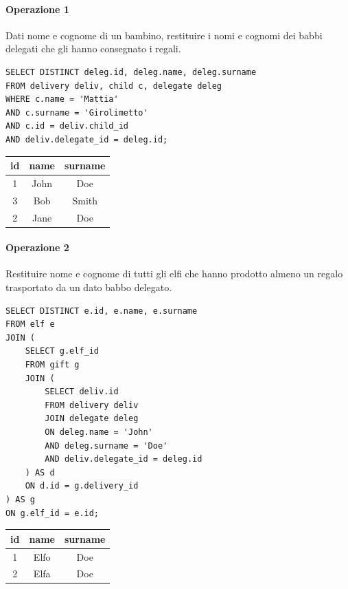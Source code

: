 \documentclass[12pt]{report}
\begin{document}
\paragraph{Operazione 1} Dati nome e cognome di un bambino, restituire i nomi e cognomi dei babbi delegati 
    che gli hanno consegnato i regali.
\begin{lstlisting}
SELECT DISTINCT deleg.id, deleg.name, deleg.surname 
FROM delivery deliv, child c, delegate deleg
WHERE c.name = 'Mattia' 
AND c.surname = 'Girolimetto'
AND c.id = deliv.child_id
AND deliv.delegate_id = deleg.id; 
\end{lstlisting}
\begin{center}
\begin{tabular}{|c|c|c|}
  \hline
  id & name & surname \\ \hline
  1 & John & Doe \\ \hline
  3 & Bob & Smith \\ \hline
  2 & Jane & Doe \\ \hline
\end{tabular}
    
\end{center}

\paragraph{Operazione 2}Restituire nome e cognome di tutti gli elfi che hanno prodotto almeno un regalo
    trasportato da un dato babbo delegato.
\begin{lstlisting}
SELECT DISTINCT e.id, e.name, e.surname 
FROM elf e 
JOIN (
	SELECT g.elf_id 
	FROM gift g
	JOIN (
		SELECT deliv.id
		FROM delivery deliv
		JOIN delegate deleg
		ON deleg.name = 'John'
		AND deleg.surname = 'Doe'
		AND deliv.delegate_id = deleg.id
	) AS d
	ON d.id = g.delivery_id
) AS g
ON g.elf_id = e.id;
\end{lstlisting}

\begin{center}
    \begin{tabular}{|c|c|c|}
  \hline
  id & name & surname \\ \hline
  1 & Elfo & Doe \\ \hline
  2 & Elfa & Doe \\ \hline
\end{tabular}

\end{center}
\end{document}
